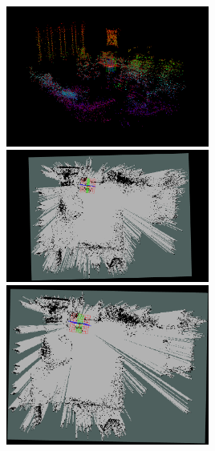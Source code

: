 \documentclass[10pt,english]{article}
\begin{document}
\vspace*{\fill}
\begin{center}
\includegraphics[width=0.5\textwidth]{images/RafCloud.png}
\linebreak
\linebreak
\includegraphics[width=0.5\textwidth]{images/RafGridNoFilter.png}
\linebreak
\linebreak
\includegraphics[width=0.5\textwidth]{images/RafGridAggressiveFilter.png}
\linebreak
\linebreak
{}
\end{center}
\vfill
\thispagestyle{empty}

\clearpage
\end{document}
